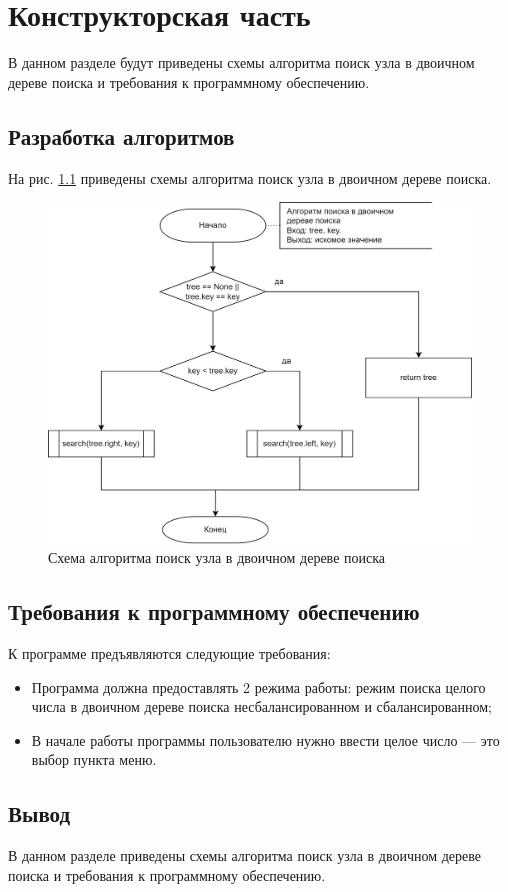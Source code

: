 \chapter{Конструкторская часть}

В данном разделе будут приведены схемы алгоритма поиск узла в двоичном дереве поиска и требования к программному обеспечению.

\section{Разработка алгоритмов}

На рис. \ref{fig:algo} приведены схемы алгоритма поиск узла в двоичном дереве поиска.


\begin{figure}[h]
	\centering
	\includegraphics[scale=0.2]{img/algo.png}
	\caption{Схема алгоритма поиск узла в двоичном дереве поиска}
	\label{fig:algo}
\end{figure}

\clearpage

\section{Требования к программному обеспечению}

К программе предъявляются следующие требования:
\begin{itemize}[label=---]
	\item Программа должна предоставлять 2 режима работы: режим поиска целого числа в двоичном дереве поиска несбалансированном и сбалансированном;
	\item В начале работы программы пользователю нужно ввести целое число --- это выбор пункта меню.
\end{itemize}

\section*{Вывод}

В данном разделе приведены схемы алгоритма поиск узла в двоичном дереве поиска и требования к программному обеспечению.

\clearpage
